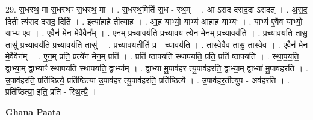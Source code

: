\documentclass[17pt]{extarticle}
\begin{document}
29. स॒धस्थ॒ मा स॒धस्थꣳ॑ स॒धस्थ॒ मा । . स॒धस्थ॒मिति॑ स॒ध - स्थ॒म् । . आ ऽस॑द दसद॒दा ऽस॑दत् । . अ॒स॒द॒ दिती त्य॑सद दसद॒ दिति॑ । . इत्या॑हा॒हे तीत्या॑ह । . आ॒ह॒ याभ्यो॒ याभ्य॑ आहाह॒ याभ्यः॑ । . याभ्य॑ ए॒वैव याभ्यो॒ याभ्य॑ ए॒व । . ए॒वैन॑ मेन मे॒वैवैन᳚म् । . ए॒न॒म् प्र॒च्या॒वय॑ति प्रच्या॒वय॑ त्येन मेनम् प्रच्या॒वय॑ति । . प्र॒च्या॒वय॑ति॒ तासु॒ तासु॑ प्रच्या॒वय॑ति प्रच्या॒वय॑ति॒ तासु॑ । . प्र॒च्या॒वय॒तीति॑ प्र - च्या॒वय॑ति । . तास्वे॒वैव तासु॒ तास्वे॒व । . ए॒वैन॑ मेन मे॒वैवैन᳚म् । . ए॒न॒म् प्रति॒ प्रत्ये॑न मेन॒म् प्रति॑ । . प्रति॑ ष्ठापयति स्थापयति॒ प्रति॒ प्रति॑ ष्ठापयति । . स्था॒प॒य॒ति॒ द्वाभ्या॒म् द्वाभ्याꣳ॑ स्थापयति स्थापयति॒ द्वाभ्या᳚म् । . द्वाभ्या॑ मु॒पाव॑हर त्यु॒पाव॑हरति॒ द्वाभ्या॒म् द्वाभ्या॑ मु॒पाव॑हरति । . उ॒पाव॑हरति॒ प्रति॑ष्ठित्यै॒ प्रति॑ष्ठित्या उ॒पाव॑हर त्यु॒पाव॑हरति॒ प्रति॑ष्ठित्यै । . उ॒पाव॑हर॒तीत्यु॑प - अव॑हरति । . प्रति॑ष्ठित्या॒ इति॒ प्रति॑ - स्थि॒त्यै॒ । \newline

\textbf{Ghana Paata } \newline
\end{document}
